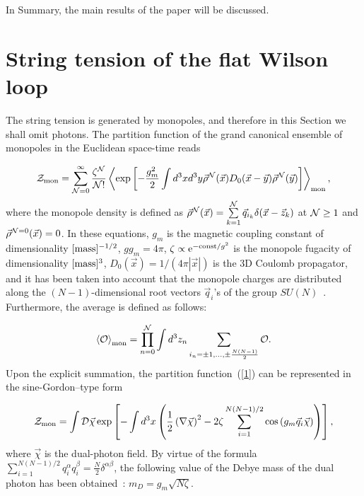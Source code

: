 \documentclass[a4paper,12pt]{article}
\begin{document}
In Summary, the main results of the paper will be discussed.


\section{String tension of the flat Wilson loop}

The string tension is generated by monopoles, and therefore in this Section we shall omit photons.
The partition function of the grand canonical ensemble of monopoles in the Euclidean space-time reads

\begin{equation}
\label{1}
{\cal Z}_{\rm mon}=\sum\limits_{{\cal N}=0}^{\infty}\frac{\zeta^{\cal N}}{{\cal N}!}
\left<\exp\left[-\frac{g_m^2}{2}\int d^3x d^3y\vec\rho^{\cal N}(\vec x)D_0(\vec x-\vec y)
\vec\rho^{\cal N}(\vec y)\right]\right>_{\rm mon},
\end{equation}
where the monopole density is defined as
$\vec\rho^{\cal N}(\vec x)=\sum\limits_{k=1}^{\cal N}\vec q_{i_k}\delta(\vec x-\vec z_k)$ at ${\cal N}\ge 1$
and $\vec\rho^{{\cal N}=0}(\vec x)=0$. In these equations, $g_m$ is the magnetic coupling constant of dimensionality $[{\rm mass}]^{-1/2}$, $gg_m=4\pi$,
$\zeta\propto {\rm e}^{-{\rm const}/g^2}$ is the monopole fugacity of dimensionality $[{\rm mass}]^{3}$,
$D_0(\vec x)=1/(4\pi|\vec x|)$
is the 3D Coulomb propagator, and it has been taken into account that the monopole charges
are distributed along the $(N-1)$-dimensional root vectors $\vec q_i$'s of the group $SU(N)$~\cite{roots}.
Furthermore, the average is defined as follows:

\begin{equation}
\label{monav}
\left<{\cal O}\right>_{\rm mon}=
\prod\limits_{n=0}^{\cal N}\int d^3z_n
\sum\limits_{i_n=\pm 1,\ldots,\pm\frac{N(N-1)}{2}}^{}{\cal O}.
\end{equation}
Upon the explicit summation, the partition function~(\ref{1}) can be represented in the sine-Gordon--type form

\begin{equation}
\label{2}
{\cal Z}_{\rm mon}=
\int {\cal D}\vec\chi\exp\left[-\int d^3x\left(\frac12\left(\nabla\vec\chi\right)^2-2\zeta\sum\limits_{i=1}^{N(N-1)/2}
\cos\left(g_m\vec q_i\vec\chi\right)\right)\right],
\end{equation}
where  $\vec\chi$ is the dual-photon field. By virtue of the formula~\cite{group}
$\sum\limits_{i=1}^{N(N-1)/2}q_i^\alpha q_i^\beta=\frac{N}{2}\delta^{\alpha\beta}$, the following value of the Debye mass of the
dual photon has been obtained~\cite{mpla}: $m_D=g_m\sqrt{N\zeta}$.
\end{document}
